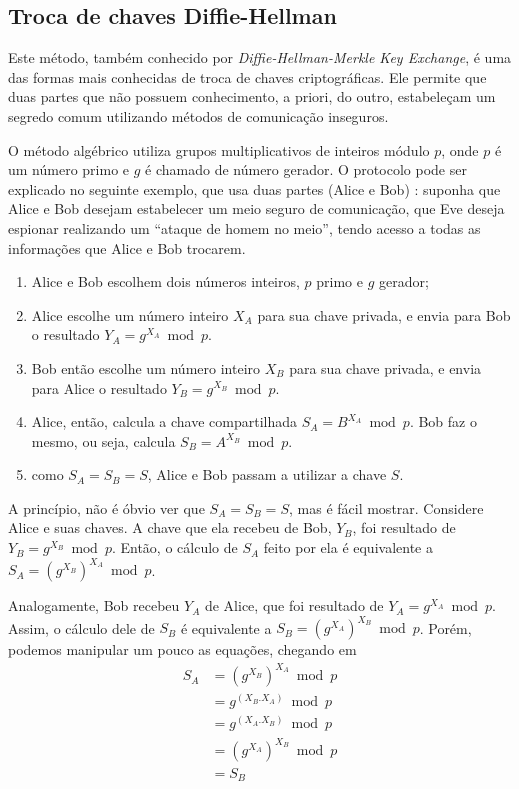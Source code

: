 
\subsection*{Troca de chaves Diffie-Hellman}

Este método, também conhecido por \emph{Diffie-Hellman-Merkle Key Exchange}, é uma das
formas mais conhecidas de troca de chaves criptográficas. Ele permite que duas partes
que não possuem conhecimento, a priori, do outro, estabeleçam um segredo comum
utilizando métodos de comunicação inseguros.

O método algébrico utiliza grupos multiplicativos de inteiros módulo $p$, onde $p$ é um
número primo e $g$ é chamado de número gerador. O protocolo pode ser explicado no
seguinte exemplo, que usa duas partes (Alice e Bob)
\cite{book:schneier,artigo:diffiehellman}: suponha que Alice e Bob desejam estabelecer
um meio seguro de comunicação, que Eve deseja espionar realizando um ``ataque de homem
no meio'', tendo acesso a todas as informações que Alice e Bob trocarem.

\begin{enumerate}
    \item Alice e Bob escolhem dois números inteiros, $p$ primo e $g$ gerador;

    \item Alice escolhe um número inteiro $X_{A}$ para sua chave privada, e envia para
        Bob o resultado $Y_{A} = g^{X_{A}} \bmod p$.

    \item Bob então escolhe um número inteiro $X_{B}$ para sua chave privada, e envia
        para Alice o resultado $Y_{B} = g^{X_{B}} \bmod p$.

    \item Alice, então, calcula a chave compartilhada $S_A = B^{X_{A}} \bmod p$. Bob faz
        o mesmo, ou seja, calcula $S_B = A^{X_{B}} \bmod p$.

    \item como $S_A = S_B = S$, Alice e Bob passam a utilizar a chave $S$.
\end{enumerate}

A princípio, não é óbvio ver que $S_A = S_B = S$, mas é fácil mostrar. Considere Alice e
suas chaves. A chave que ela recebeu de Bob, $Y_{B}$, foi resultado de
$Y_{B} = g^{X_{B}} \bmod p$. Então, o cálculo de $S_A$ feito por ela é equivalente a
$S_A = (g^{X_{B}})^{X_{A}} \bmod p$.

Analogamente, Bob recebeu $Y_{A}$ de Alice, que foi resultado de
$Y_{A} = g^{X_{A}} \bmod p$. Assim, o cálculo dele de $S_B$ é equivalente a
$S_B = (g^{X_{A}})^{X_{B}} \bmod p$. Porém, podemos manipular um pouco as equações,
chegando em
\begin{align*}
S_A & = (g^{X_{B}})^{X_{A}} \bmod p \\
    & = g^{(X_{B}.X_{A})}   \bmod p \\
    & = g^{(X_{A}.X_{B})}   \bmod p \\
    & = (g^{X_{A}})^{X_{B}} \bmod p \\
    & = S_B
\end{align*}

